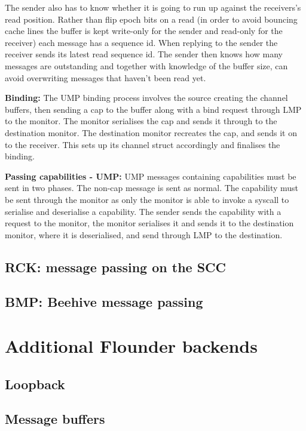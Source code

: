 \documentclass[a4paper,twoside]{report} %
\begin{document}
The sender also has to know whether it is going to run up against the
receivers's read position. Rather than flip epoch bits on a read (in order to
avoid bouncing cache lines the buffer is kept write-only for the sender and
read-only for the receiver) each message has a sequence id. When replying to the
sender the receiver sends its latest read sequence id. The sender then knows how
many messages are outstanding and together with knowledge of the buffer size,
can avoid overwriting messages that haven't been read yet.

\textbf{Binding:} The UMP binding process involves the source creating the
channel buffers, then sending a cap to the buffer along with a bind request
through LMP to the monitor. The monitor serialises the cap and sends it through
to the destination monitor. The destination monitor recreates the cap, and sends
it on to the receiver. This sets up its channel struct accordingly and finalises
the binding.

\textbf{Passing capabilities - UMP:} UMP messages containing capabilities must
be sent in two phases. The non-cap message is sent as normal. The capability
must be sent through the monitor as only the monitor is able to invoke a syscall
to serialise and deserialise a capability. The sender sends the capability with
a request to the monitor, the monitor serialises it and sends it to the
destination monitor, where it is deserialised, and send through LMP to the
destination.

\section{RCK: message passing on the SCC}
\label{sec:rck_icd}

\section{BMP: Beehive message passing}
\label{sec:bmp_icd}

\chapter{Additional Flounder backends}

\section{Loopback}

\section{Message buffers}
\end{document}
